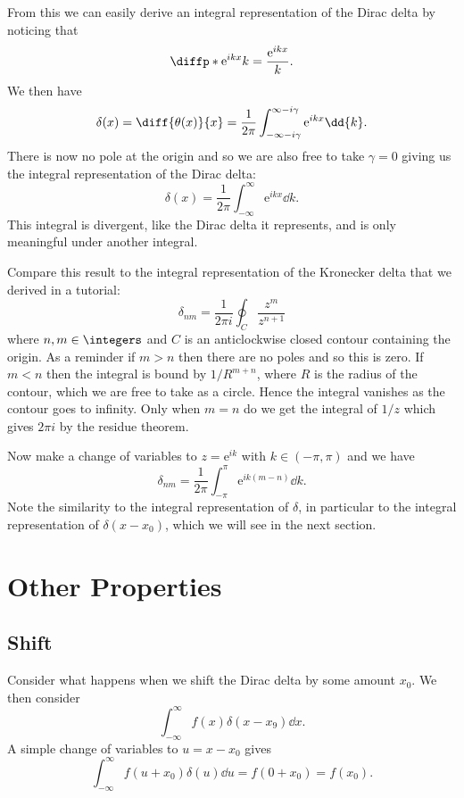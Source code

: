 \documentclass[fleqn]{NotesClass}
\newcommand*{\e}{\mathrm{e}}
\begin{document}
    From this we can easily derive an integral representation of the Dirac delta by noticing that
    \begin{equation}
        \diffp*{\e^{ikx}}{k} = \frac{\e^{ikx}}{k}.
    \end{equation}
    We then have
    \begin{equation}
        \delta(x) = \diff{\theta(x)}{x} = \frac{1}{2\pi} \int_{-\infty-i\gamma}^{\infty-i\gamma} \e^{ikx} \dd{k}.
    \end{equation}
    There is now no pole at the origin and so we are also free to take \(\gamma = 0\) giving us the integral representation of the Dirac delta:
    \begin{equation}
        \delta(x) = \frac{1}{2\pi}\int_{-\infty}^{\infty} \e^{ikx} \dd{k}.
    \end{equation}
    This integral is divergent, like the Dirac delta it represents, and is only meaningful under another integral.
    
    Compare this result to the integral representation of the Kronecker delta that we derived in a tutorial:
    \begin{equation}
        \delta_{nm} = \frac{1}{2\pi i} \oint_{C} \frac{z^m}{z^{n+1}}
    \end{equation}
    where \(n, m \in \integers\) and \(C\) is an anticlockwise closed contour containing the origin.
    As a reminder if \(m > n\) then there are no poles and so this is zero.
    If \(m < n\) then the integral is bound by \(1/R^{m+n}\), where \(R\) is the radius of the contour, which we are free to take as a circle.
    Hence the integral vanishes as the contour goes to infinity.
    Only when \(m = n\) do we get the integral of \(1/z\) which gives \(2\pi i\) by the residue theorem.
    
    Now make a change of variables to \(z = \e^{ik}\) with \(k \in (-\pi, \pi)\) and we have
    \begin{equation}
        \delta_{nm} = \frac{1}{2\pi} \int_{-\pi}^{\pi} \e^{ik(m - n)} \dd{k}.
    \end{equation}
    Note the similarity to the integral representation of \(\delta\), in particular to the integral representation of \(\delta(x - x_0)\), which we will see in the next section.
    
    \section{Other Properties}
    \subsection{Shift}
    Consider what happens when we shift the Dirac delta by some amount \(x_0\).
    We then consider
    \begin{equation}
        \int_{-\infty}^{\infty} f(x)\delta(x - x_9) \dd{x}.
    \end{equation}
    A simple change of variables to \(u = x - x_0\) gives
    \begin{equation}
        \int_{-\infty}^{\infty} f(u + x_0)\delta(u) \dd{u} = f(0 + x_0) = f(x_0).
    \end{equation}
    
\end{document}
